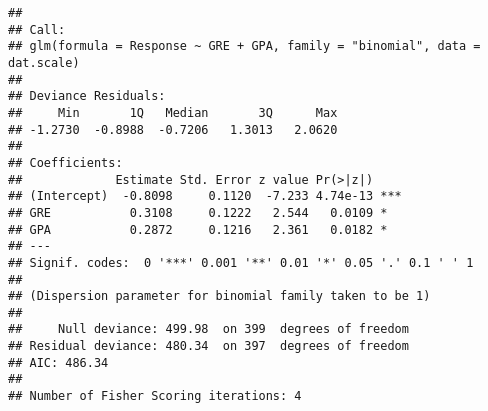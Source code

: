 \documentclass[
]{article}
\newenvironment{Shaded}{\begin{snugshade}}{\end{snugshade}}
\newcommand{\AttributeTok}[1]{\textcolor[rgb]{0.77,0.63,0.00}{#1}}
\newcommand{\CommentTok}[1]{\textcolor[rgb]{0.56,0.35,0.01}{\textit{#1}}}
\newcommand{\FunctionTok}[1]{\textcolor[rgb]{0.00,0.00,0.00}{#1}}
\newcommand{\NormalTok}[1]{#1}
\newcommand{\OtherTok}[1]{\textcolor[rgb]{0.56,0.35,0.01}{#1}}
\newcommand{\SpecialCharTok}[1]{\textcolor[rgb]{0.00,0.00,0.00}{#1}}
\newcommand{\StringTok}[1]{\textcolor[rgb]{0.31,0.60,0.02}{#1}}
\begin{document}
\begin{Shaded}
\end{Shaded}

\begin{verbatim}
## 
## Call:
## glm(formula = Response ~ GRE + GPA, family = "binomial", data = dat.scale)
## 
## Deviance Residuals: 
##     Min       1Q   Median       3Q      Max  
## -1.2730  -0.8988  -0.7206   1.3013   2.0620  
## 
## Coefficients:
##             Estimate Std. Error z value Pr(>|z|)    
## (Intercept)  -0.8098     0.1120  -7.233 4.74e-13 ***
## GRE           0.3108     0.1222   2.544   0.0109 *  
## GPA           0.2872     0.1216   2.361   0.0182 *  
## ---
## Signif. codes:  0 '***' 0.001 '**' 0.01 '*' 0.05 '.' 0.1 ' ' 1
## 
## (Dispersion parameter for binomial family taken to be 1)
## 
##     Null deviance: 499.98  on 399  degrees of freedom
## Residual deviance: 480.34  on 397  degrees of freedom
## AIC: 486.34
## 
## Number of Fisher Scoring iterations: 4
\end{verbatim}
\end{document}
